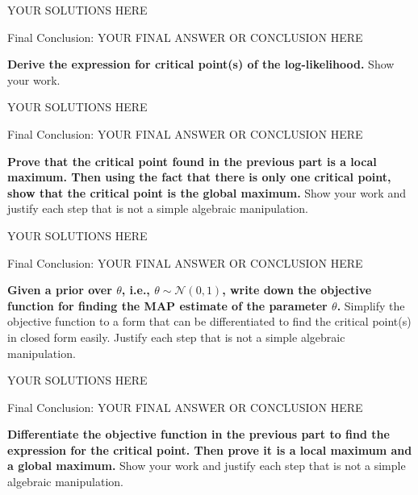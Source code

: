 \begin{solution}

YOUR SOLUTIONS HERE

{\color{red} Final Conclusion: YOUR FINAL ANSWER OR CONCLUSION HERE}

\end{solution}

\qpart{[5 points]}
\textbf{Derive the expression for critical point(s) of the log-likelihood.} Show your work. 

\begin{solution}

YOUR SOLUTIONS HERE

{\color{red} Final Conclusion: YOUR FINAL ANSWER OR CONCLUSION HERE}

\end{solution}

\qpart{[5 points]}

\textbf{Prove that the critical point found in the previous part is a local maximum. Then using the fact that there is only one critical point, show that the critical point is the global maximum.} Show your work and justify each step that is not a simple algebraic manipulation. 

\begin{solution}

YOUR SOLUTIONS HERE

{\color{red} Final Conclusion: YOUR FINAL ANSWER OR CONCLUSION HERE}

\end{solution}


\qpart{[5 points]}

\textbf{Given a prior over $\theta$, i.e., $\theta \sim \mathcal{N}(0,1)$, write down the objective function for finding the MAP estimate of the parameter $\theta$.} Simplify the objective function to a form that can be differentiated to find the critical point(s) in closed form easily. Justify each step that is not a simple algebraic manipulation. 

\begin{solution}

YOUR SOLUTIONS HERE

{\color{red} Final Conclusion: YOUR FINAL ANSWER OR CONCLUSION HERE}

\end{solution}



\qpart{[5 points]}

\textbf{Differentiate the objective function in the previous part to find the expression for the critical point. Then prove it is a local maximum and a global maximum.} Show your work and justify each step that is not a simple algebraic manipulation.

